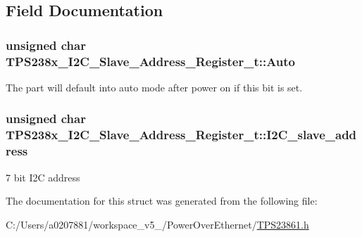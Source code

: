 \subsection{Field Documentation}
\hypertarget{struct_t_p_s238x___i2_c___slave___address___register__t_a565486a94b18eda9249c26e391a27816}{
\subsubsection[{Auto}]{\setlength{\rightskip}{0pt plus 5cm}unsigned char T\-P\-S238x\-\_\-\-I2\-C\-\_\-\-Slave\-\_\-\-Address\-\_\-\-Register\-\_\-t\-::\-Auto}}\label{struct_t_p_s238x___i2_c___slave___address___register__t_a565486a94b18eda9249c26e391a27816}


The part will default into auto mode after power on if this bit is set. 

\hypertarget{struct_t_p_s238x___i2_c___slave___address___register__t_a94600a1a08c1e36d8843eecfb7e61280}{
\subsubsection[{I2\-C\-\_\-slave\-\_\-address}]{\setlength{\rightskip}{0pt plus 5cm}unsigned char T\-P\-S238x\-\_\-\-I2\-C\-\_\-\-Slave\-\_\-\-Address\-\_\-\-Register\-\_\-t\-::\-I2\-C\-\_\-slave\-\_\-address}}\label{struct_t_p_s238x___i2_c___slave___address___register__t_a94600a1a08c1e36d8843eecfb7e61280}


7 bit I2\-C address 



The documentation for this struct was generated from the following file\-:\begin{DoxyCompactItemize}
\item 
C\-:/\-Users/a0207881/workspace\-\_\-v5\-\_/\-Power\-Over\-Ethernet/\hyperlink{_t_p_s23861_8h}{T\-P\-S23861.\-h}\end{DoxyCompactItemize}
